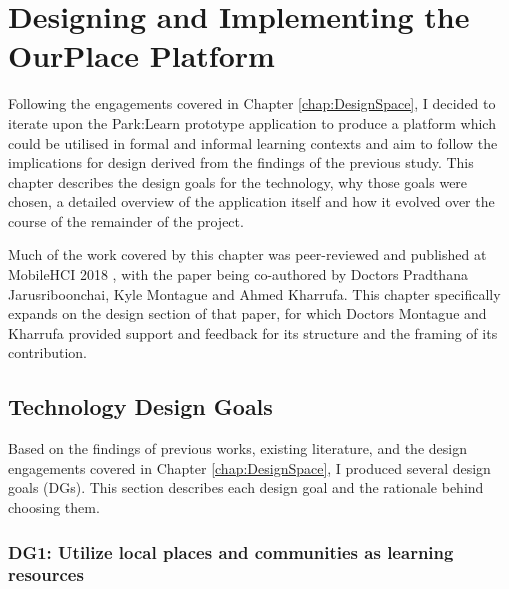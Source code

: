 \chapter{Designing and Implementing the OurPlace Platform}
\label{chap:Design}

Following the engagements covered in Chapter \ref{chap:DesignSpace}, I decided to iterate upon the Park:Learn prototype application to produce a platform which could be utilised in formal and informal learning contexts and aim to follow the implications for design derived from the findings of the previous study. This chapter describes the design goals for the technology, why those goals were chosen, a detailed overview of the application itself and how it evolved over the course of the remainder of the project. 

Much of the work covered by this chapter was peer-reviewed and published at MobileHCI 2018 \citep{Richardson2018}, with the paper being co-authored by Doctors Pradthana Jarusriboonchai, Kyle Montague and Ahmed Kharrufa. This chapter specifically expands on the design section of that paper, for which Doctors Montague and Kharrufa provided support and feedback for its structure and the framing of its contribution.

\section{Technology Design Goals}
\label{sec:DesignGoals}
Based on the findings of previous works, existing literature, and the design engagements covered in Chapter \ref{chap:DesignSpace}, I produced several design goals (DGs). This section describes each design goal and the rationale behind choosing them.


\subsection*{ DG1: Utilize local places and communities as learning resources }
\label{DG1}

